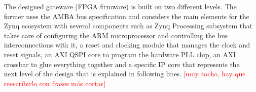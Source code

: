 %
%

The designed gateware (FPGA firmware) is built on two different levels. The former uses the AMBA bus specification and considers the main elements for the Zynq ecosystem with several components such as Zynq Processing subsystem that takes care of configuring the ARM microprocessor and controlling the bus interconnections with it, a reset and clocking module that manages the clock and reset signals, an AXI QSPI core to program the hardware PLL chip, an AXI crossbar to glue everything together and a specific IP core that represents the next level of the design that is explained in following lines.
\textcolor{red}{[muy tocho, hay que reescribirlo con frases más cortas]}


